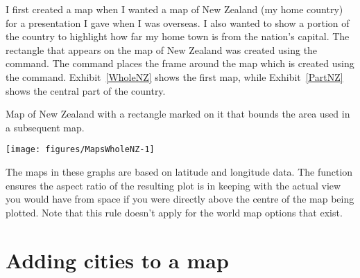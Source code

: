 I first created a map when I wanted a map of New Zealand (my home country) for a presentation I gave when I was overseas. I also wanted to show a portion of the country to highlight how far my home town is from the nation's capital. The rectangle that appears on the map of New Zealand was created using the  command. The  command places the frame around the map which is created using the  command. Exhibit~\ref{WholeNZ} shows the first map, while Exhibit~\ref{PartNZ} shows the central part of the country. 
\begin{exhibit} 
\caption{Map of New Zealand with a rectangle marked on it that bounds the area used in a subsequent map.} 
\label{WholeNZ} 
\begin{center} 
\begin{knitrout}
\color{fgcolor}\begin{kframe}
\begin{alltt}
\hlstd{> }\hlstd{(}\hlstd{,} \hlstd{=}\hlstd{(}\hlopt{-}\hlstd{,}\hlopt{-}\hlstd{),} \hlstd{=}\hlstd{(}\hlstd{,}\hlstd{),}  \hlstd{=}\hlstd{)}
\hlstd{> }\hlstd{()}
\hlstd{> }\hlstd{(}\hlstd{=}\hlstd{(}\hlstd{,} \hlstd{,} \hlstd{,} \hlstd{),} \hlstd{=}\hlstd{(}\hlopt{-}\hlstd{,}\hlopt{-}\hlstd{,} \hlopt{-}\hlstd{,}\hlopt{-}\hlstd{),} \hlstd{=}\hlstd{,} \hlstd{=}\hlstd{)}
\end{alltt}
\end{kframe}
\texttt{[image: figures/MapsWholeNZ-1]} 

\end{knitrout}
\end{center} 
\end{exhibit} 
 
The maps in these graphs are based on latitude and longitude data. The  function ensures the aspect ratio of the resulting plot is in keeping with the actual view you would have from space if you were directly above the centre of the map being plotted. Note that this rule doesn't apply for the world map options that exist. 
 
\section{Adding cities to a map} 
 

